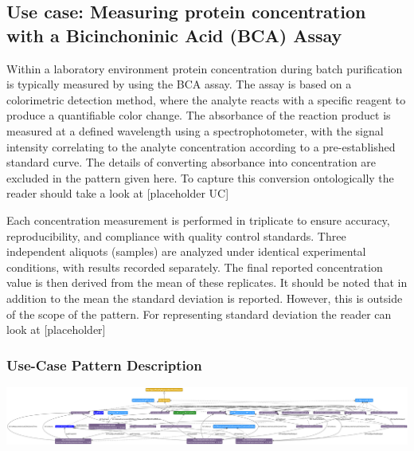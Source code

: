 \subsection{Use case: Measuring protein concentration with a  Bicinchoninic Acid (BCA) Assay}
Within a laboratory environment protein concentration during batch purification is typically measured by using the BCA assay. The assay is based on a colorimetric detection method, where the analyte reacts with a specific reagent to produce a quantifiable color change. The absorbance of the reaction product is measured at a defined wavelength using a spectrophotometer, with the signal intensity correlating to the analyte concentration according to a pre-established standard curve.  The details of converting absorbance into concentration are excluded in the pattern given here. To capture this conversion ontologically the reader should take a look at [placeholder UC] 

Each concentration measurement is performed in triplicate to ensure accuracy, reproducibility, and compliance with quality control standards. Three independent aliquots (samples) are analyzed under identical experimental conditions, with results recorded separately. The final reported concentration value is then derived from the mean of these replicates. It should be noted that in addition to the mean the standard deviation is reported. However, this is outside of the scope of the pattern. For representing standard deviation the reader can look at [placeholder]

\subsubsection*{Use-Case Pattern Description}

\includegraphics[scale=0.23]{scenarios/measurements/image/measurement_aggregate_usecase1.png}
